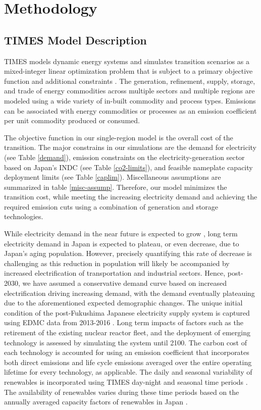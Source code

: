 \section{Methodology} \label{method}
\subsection{TIMES Model Description}
\gls{TIMES} models dynamic energy systems and simulates transition scenarios as a mixed-integer linear optimization problem that is subject to a primary objective function and additional constraints \cite{loulou_etsap-tiam_2008}. The generation, refinement, supply, storage, and trade of energy commodities across multiple sectors and multiple regions are modeled using a wide variety of in-built commodity and process types. Emissions can be associated with energy commodities or processes as an emission coefficient per unit commodity produced or consumed. 

The objective function in our single-region model is the overall cost of the transition. The major constrains in our simulations are the demand for electricity (see Table \ref{demand}), emission constraints on the electricity-generation sector based on Japan's \gls{INDC} (see Table \ref{co2-limits}), and feasible nameplate capacity deployment limits (see Table \ref{caplim}). Miscellaneous assumptions are summarized in table \ref{misc-assump}. Therefore, our model minimizes the transition cost, while meeting the increasing electricity demand and achieving the required emission cuts using a combination of generation and storage technologies. 

While electricity demand in the near future is expected to grow \cite{noauthor_electricity_2019}, long term electricity demand in Japan is expected to plateau, or even decrease, due to Japan's aging population. However, precisely quantifying this rate of decrease is challenging as this reduction in population will likely be accompanied by increased electrification of transportation and industrial sectors. Hence, post-2030, we have assumed a conservative demand curve based on increased electrification driving increasing demand, with the demand eventually plateauing due to the aforementioned expected demographic changes. The unique initial condition of the post-Fukushima Japanese electricity supply system is captured using \gls{EDMC} data from 2013-2016 \cite{the_institute_of_energy_economics_japan_energy_2018}. Long term impacts of factors such as the retirement of the existing nuclear reactor fleet, and the deployment of emerging technology is assessed by simulating the system until 2100. The carbon cost of each technology is accounted for using an emission coefficient that incorporates both direct emissions and life cycle emissions averaged over the entire operating lifetime for every technology, as applicable. The daily and seasonal variability of renewables is incorporated using \gls{TIMES} day-night and seasonal time periods \cite{loulou_etsap-tiam_2008}. The availability of renewables varies during these time periods based on the annually averaged capacity factors of renewables in Japan \cite{the_institute_of_energy_economics_japan_energy_2018, irena_renewable_2020}.

